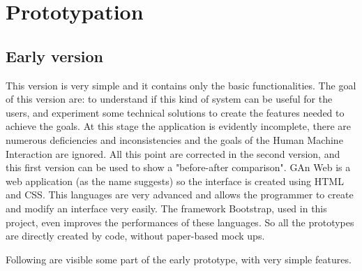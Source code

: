 
\chapter{Prototypation} %

\label{Chapter4} %


\section{Early version}

This version is very simple and it contains only the basic functionalities. 
The goal of this version are: to understand if this kind of system can be useful for the users, and experiment some technical solutions to create the features needed to achieve the goals. At this stage the application is evidently incomplete, there are numerous deficiencies and inconsistencies and the goals of the Human Machine Interaction are ignored. All this point are corrected in the second version, and this first version can be used to show a "before-after comparison".
GAn Web is a web application (as the name suggests) so the interface is created using HTML and CSS. This languages are very advanced and allows the programmer to create and modify an interface very easily. The framework Bootstrap, used in this project, even improves the performances of these languages. So all the prototypes are directly created by code, without paper-based mock ups.

Following are visible some part of the early prototype, with very simple features.


